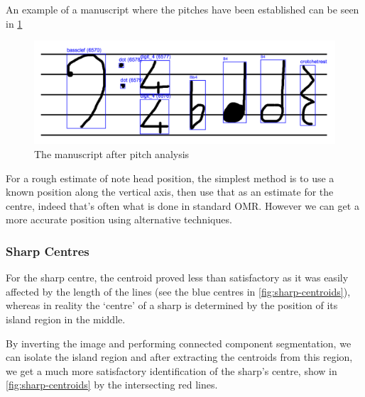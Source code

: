 An example of a manuscript where the pitches have been established can be seen in \cref{fig:canvas-pitches}

\begin{figure}[hbt]
  \includegraphics[width=\linewidth]{gfx/techniques/labelling/pitch.png}
  \caption{The manuscript after pitch analysis}
  \label{fig:canvas-pitches}
\end{figure}

For a rough estimate of note head position, the simplest method is to use a known position along the vertical axis, then use that as an estimate for the centre, indeed that's often what is done in standard OMR. However we can get a more accurate position using alternative techniques.

\subsubsection{Sharp Centres}
For the sharp centre, the centroid proved less than satisfactory as it was easily affected by the length of the lines (see the blue centres in \cref{fig:sharp-centroids}), whereas in reality the `centre' of a sharp is determined by the position of its island region in the middle.

By inverting the image and performing connected component segmentation, we can isolate the island region and after extracting the centroids from this region, we get a much more satisfactory identification of the sharp's centre, show in \cref{fig:sharp-centroids} by the intersecting red lines.

